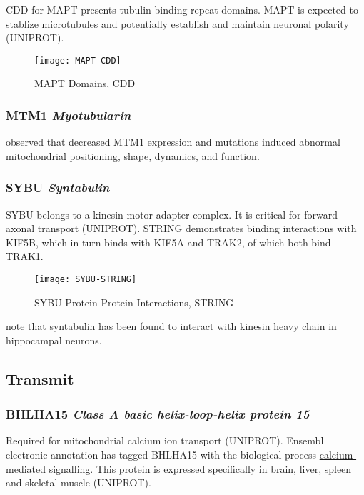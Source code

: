 CDD for MAPT presents tubulin binding repeat domains. MAPT is expected to
stablize microtubules and potentially establish and maintain neuronal polarity
(UNIPROT).

\begin{figure}[h!]
  \texttt{[image: MAPT-CDD]}
  \caption{MAPT Domains, CDD}
\end{figure}

\subsubsection{MTM1 \textit{Myotubularin}}

\cite{Hnia2011} observed that decreased MTM1 expression and mutations
induced abnormal mitochondrial positioning, shape, dynamics, and function.

\subsubsection{SYBU \textit{Syntabulin}}

SYBU belongs to a kinesin motor-adapter complex. It is critical for forward
axonal transport (UNIPROT). STRING demonstrates binding interactions with
KIF5B, which in turn binds with KIF5A and TRAK2, of which both bind TRAK1.

\begin{figure}[h!]
  \centering
  \texttt{[image: SYBU-STRING]}
  \caption{SYBU Protein-Protein Interactions, STRING}
\end{figure}

\cite{Reis2009} note that syntabulin has been found to interact with kinesin
heavy chain in hippocampal neurons.

\subsection{Transmit}

\subsubsection{BHLHA15 \textit{Class A basic helix-loop-helix protein 15}}

Required for mitochondrial calcium ion transport (UNIPROT). Ensembl electronic
annotation has tagged BHLHA15 with the biological process
\href{http://www.ebi.ac.uk/QuickGO/GTerm?id=GO:0019722}{calcium-mediated
signalling}. This protein is expressed specifically in brain, liver,
spleen and skeletal muscle (UNIPROT).

